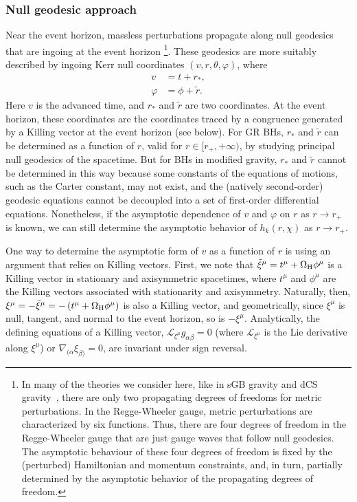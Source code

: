 \documentclass[aps,prx,amsmath,floats,floatfix,twocolumn,
  superscriptaddress,nofootinbib,showpacs]{revtex4-1}
\begin{document}
\subsubsection{Null geodesic approach}
\label{sec:null_geodesic_approach}

Near the event horizon, massless perturbations propagate along null geodesics that are ingoing at the event horizon \footnote{In many of the theories we consider here, like in sGB gravity and dCS gravity~\cite{Wagle:2019mdq}, there are only two propagating degrees of freedoms for metric perturbations. In the Regge-Wheeler gauge, metric perturbations are characterized by six functions. 
Thus, there are four degrees of freedom in the Regge-Wheeler gauge that are just gauge waves that follow null geodesics. 
The asymptotic behaviour of these four degrees of freedom is fixed by the (perturbed) Hamiltonian and momentum constraints, and, in turn, partially determined by the asymptotic behavior of the propagating degrees of freedom.
}. 
These geodesics are more suitably described by ingoing Kerr null coordinates $(v, r, \theta, \varphi)$, where
\begin{equation}
\begin{split}
v & = t + r_*, \\
\varphi & = \phi + \tilde{r}. 
\end{split}
\end{equation}
Here $v$ is the advanced time, and $r_*$ and $\tilde{r}$ are two coordinates. 
At the event horizon, these coordinates are the coordinates traced by a congruence generated by a Killing vector at the event horizon (see below). 
For GR BHs, $r_*$ and $\tilde{r}$ can be determined as a function of $r$, valid for $r \in [r_+, + \infty)$, by studying principal null geodesics of the spacetime. 
But for BHs in modified gravity, $r_*$ and $\tilde{r}$ cannot be determined in this way because some constants of the equations of motions, such as the Carter constant, may not exist, and the (natively second-order) geodesic equations cannot be decoupled into a set of first-order differential equations. 
Nonetheless, if the asymptotic dependence of $v$ and $\varphi$ on $r$ as $r \rightarrow r_+$ is known, we can still determine the asymptotic behavior of $h_k(r, \chi)$ as $r \rightarrow r_+$. 

One way to determine the asymptotic form of $v$ as a function of $r$ is using an argument that relies on Killing vectors. 
First, we note that $\tilde{\xi}^{\mu} = t^{\mu} + \Omega_{\rm H} \phi^{\mu}$ is a Killing vector in stationary and axisymmetric spacetimes, where $t^{\mu}$ and $\phi^{\mu}$ are the Killing vectors associated with stationarity and axisymmetry. Naturally, then, $\xi^{\mu} = - \tilde{\xi}^{\mu} = -\left( t^{\mu} + \Omega_{\rm H} \phi^{\mu} \right)$ is also a Killing vector, and geometrically, since $\xi^{\mu}$ is null, tangent, and normal to the event horizon, so is $-\xi^{\mu}$. 
Analytically, the defining equations of a Killing vector, $\mathcal{L}_{{\xi}^{\mu}} g_{\alpha \beta}=0$ (where $\mathcal{L}_{{\xi}^{\mu}}$ is the Lie derivative along ${{\xi}^{\mu}}$) or $\nabla_{(\alpha} \xi_{\beta)} = 0$, are invariant under sign reversal. 
\end{document}
